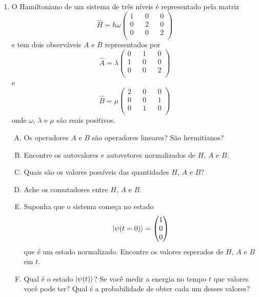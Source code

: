 \documentclass[a4paper, 12pt, notitlepage]{article}
\begin{document}
\begin{enumerate}
\item O Hamiltoniano de um sistema de três níveis é representado pela matriz  
\begin{equation*}
\hat{H} = \hbar \omega
  \begin{pmatrix}
  1 && 0 && 0 \\
  0 && 2 && 0 \\
  0 && 0 && 2 \\
  \end{pmatrix}
\end{equation*}
\noindent e tem dois observáveis $A$ e $B$ representados por
\begin{equation*}
\hat{A} = \lambda
  \begin{pmatrix}
    0 && 1 && 0\\
    1 && 0 && 0\\
    0 && 0 && 2\\
  \end{pmatrix}
\end{equation*}
\noindent e
\begin{equation*}
\hat{B} = \mu
  \begin{pmatrix*}
    2 && 0 && 0\\
    0 && 0 && 1\\
    0 && 1 && 0\\
  \end{pmatrix*}
\end{equation*}
\noindent onde $\omega$, $\lambda$ e $\mu$ são reais positivos.
\begin{enumerate}[(A)]
  \item Os operadores $A$ e $B$ são operadores lineares? São hermitianos?
  \item Encontre os autovalores e autovetores normalizados de $H$, $A$ e $B$.
  \item Quais são os valores possíveis das quantidades $H$, $A$ e $B$?
  \item Ache os comutadores entre $H$, $A$ e $B$.
  \item Suponha que o sistema começa no estado
    \begin{equation*}
      \ket{\psi(t = 0)} = \begin{pmatrix} 1 \\ 0 \\ 0 \end{pmatrix}
    \end{equation*}
  \noindent que é um estado normalizado. Encontre os valores esperados de $H$, $A$ e $B$ em $t$.
  \item Qual é o estado $\ket{\psi(t)}$? Se você medir a energia no tempo $t$ que valores você pode ter? Qual é a probabilidade de obter cada um desses valores?
\end{enumerate}


\end{enumerate}
\end{document}
